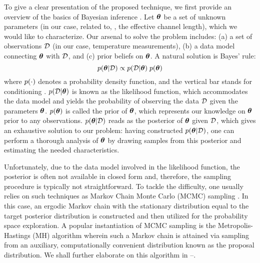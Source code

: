 To give a clear presentation of the proposed technique, we first provide an overview of the basics of Bayesian inference \cite{gelman2004}.
Let ${\boldsymbol\theta}$ be a set of unknown parameters (in our case, related to, \eg, the effective channel length), which we would like to characterize. Our arsenal to solve the problem includes: (a) a set of observations $\mathcal{D}$ (in our case, temperature measurements), (b) a data model connecting ${\boldsymbol\theta}$ with $\mathcal{D}$, and (c) prior beliefs on ${\boldsymbol\theta}$. A natural solution is Bayes' rule:
\begin{equation} \elabel{bayes}
  \f{\vparam | \Data} \propto \f{\Data | \vparam} \; \f{\vparam}
\end{equation}
where $\f{\cdot}$ denotes a probability density function, and the vertical bar stands for conditioning \cite{durrett2010}.
$\f{\Data | \vparam}$ is known as the likelihood function, which accommodates the data model and yields the probability of observing the data $\mathcal{D}$ given the parameters ${\boldsymbol\theta}$.
$\f{\vparam}$ is called the prior of ${\boldsymbol\theta}$, which represents our knowledge on ${\boldsymbol\theta}$ prior to any observations.
$\f{\vparam | \Data}$ reads as the posterior of ${\boldsymbol\theta}$ given $\mathcal{D}$, which gives an exhaustive solution to our problem: having constructed $\f{\vparam | \Data}$, one can perform a thorough analysis of ${\boldsymbol\theta}$ by drawing samples from this posterior and estimating the needed characteristics.

Unfortunately, due to the data model involved in the likelihood function, the posterior is often not available in closed form and, therefore, the sampling procedure is typically not straightforward.
To tackle the difficulty, one usually relies on such techniques as Markov Chain Monte Carlo (MCMC) sampling \cite{gelman2004}. In this case, an ergodic Markov chain with the stationary distribution equal to the target posterior distribution is constructed and then utilized for the probability space exploration.
A popular instantiation of MCMC sampling is the Metropolis-Hastings (MH) algorithm wherein such a Markov chain is attained via sampling from an auxiliary, computationally convenient distribution known as the proposal distribution. We shall further elaborate on this algorithm in --.
